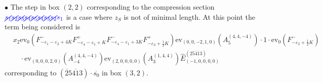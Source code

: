 \documentclass[11pt]{article}
\theoremstyle{plain}
\theoremstyle{definition}
\newenvironment{example}
  {\pushQED{\qed}\exampleinner}
  {\popQED\endexampleinner}
\theoremstyle{remark}
\numberwithin{equation}{section}
\def\ev{\mathrm{ev}}
\newcounter{r}
\newcounter{s}
\begin{document}
\begin{example}
\noindent
$\bullet$
The step in box $(2,2)$ corresponding to the compression section ${\color{blue} \cancel{s_{1}} \cancel{s_{2}} \cancel{s_{3}} \cancel{s_{4}}\cancel{s_{5}} \cancel{s_{4}}\cancel{s_{3}}\cancel{s_{2}}s_{1}}$ is a case where $z_S$ is not of minimal length. At this point
the term being considered is
\begin{align*}
&x_2\ev_0(F^-_{-\varepsilon_1-\varepsilon_2+4K} F^+_{-\varepsilon_4-\varepsilon_5+K}
F^-_{-\varepsilon_4-\varepsilon_1+3K} F^+_{-\varepsilon_3+\frac12K})
\ev_{(0,0,-2,1,0)}(A^{(4,4,-4)}_{5})\cdot 1 \cdot \ev_0(F^-_{-\varepsilon_2+\frac12 K})
\\
&\quad\cdot 
\ev_{(0,0,0,2,0)}(A^{(4,4,-4)}_{-4})
\ev_{(2,0,0,0,0)}(A^{(1,4,4)}_3) 
\widehat{E}^{(25\overline{4}\overline{1}3)}_{(-1,0,0,0,0)}
\end{align*}
corresponding to $(\overline{2}5\overline{41}3)\cdot\overline{s_0}$ in box $(3,2)$.


\end{example}
\end{document}
